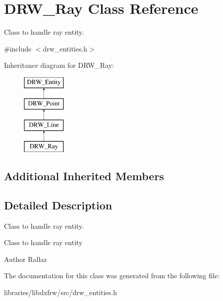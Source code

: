 \hypertarget{classDRW__Ray}{\section{D\-R\-W\-\_\-\-Ray Class Reference}
\label{classDRW__Ray}
}


Class to handle ray entity.  




{\ttfamily \#include $<$drw\-\_\-entities.\-h$>$}

Inheritance diagram for D\-R\-W\-\_\-\-Ray\-:\begin{figure}[H]
\begin{center}
\leavevmode
\includegraphics[height=4.000000cm]{classDRW__Ray}
\end{center}
\end{figure}
\subsection*{Additional Inherited Members}


\subsection{Detailed Description}
Class to handle ray entity. 

Class to handle ray entity \begin{DoxyAuthor}{Author}
Rallaz 
\end{DoxyAuthor}


The documentation for this class was generated from the following file\-:\begin{DoxyCompactItemize}
\item 
libraries/libdxfrw/src/drw\-\_\-entities.\-h\end{DoxyCompactItemize}
